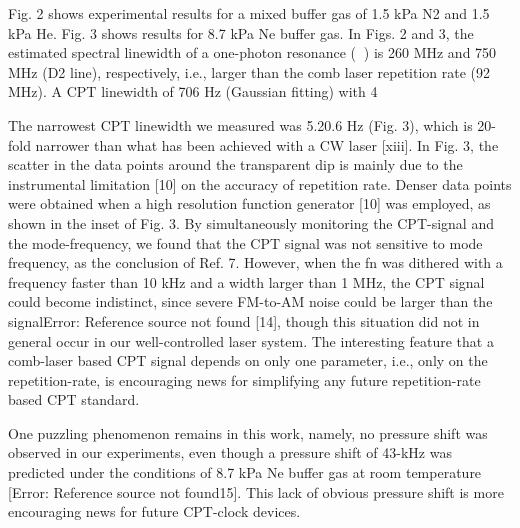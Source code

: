 Fig. 2 shows experimental results for a mixed buffer gas of 1.5 kPa N2 and 1.5 kPa He. Fig. 3 shows results for 8.7 kPa Ne buffer gas. In Figs. 2 and 3, the estimated spectral linewidth of a one-photon resonance () is 260 MHz and 750 MHz (D2 line), respectively, i.e., larger than the comb laser repetition rate (92 MHz). A CPT linewidth of 706 Hz (Gaussian fitting) with 4%

The narrowest CPT linewidth we measured was 5.20.6 Hz (Fig. 3), which is 20-fold narrower than what has been achieved with a CW laser [xiii]. In Fig. 3, the scatter in the data points around the transparent dip is mainly due to the instrumental limitation [10] on the accuracy of repetition rate. Denser data points were obtained when a high resolution function generator [10] was employed, as shown in the inset of Fig. 3. By simultaneously monitoring the CPT-signal and the mode-frequency, we found that the CPT signal was not sensitive to mode frequency, as the conclusion of Ref. 7. However, when the fn was dithered with a frequency faster than 10 kHz and a width larger than 1 MHz, the CPT signal could become indistinct, since severe FM-to-AM noise could be larger than the signalError: Reference source not found [14], though this situation did not in general occur in our well-controlled laser system. The interesting feature that a comb-laser based CPT signal depends on only one parameter, i.e., only on the repetition-rate, is encouraging news for simplifying any future repetition-rate based CPT standard. 

One puzzling phenomenon remains in this work, namely, no pressure shift was observed in our experiments, even though a pressure shift of 43-kHz was predicted under the conditions of 8.7 kPa Ne buffer gas at room temperature [Error: Reference source not found15]. This lack of obvious pressure shift is more encouraging news for future CPT-clock devices.

